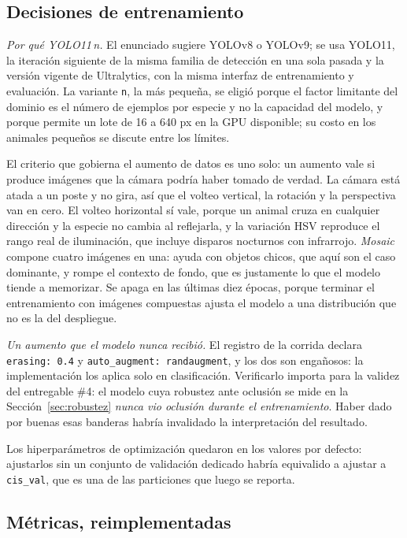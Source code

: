 \subsection{Decisiones de entrenamiento}
\label{sec:metodo_aumento}



\emph{Por qué YOLO11\,n.} El enunciado sugiere YOLOv8 o YOLOv9; se usa YOLO11,
la iteración siguiente de la misma familia de detección en una sola pasada y la
versión vigente de Ultralytics, con la misma interfaz de entrenamiento y
evaluación. La variante \texttt{n}, la más pequeña, se eligió porque el factor
limitante del dominio es el número de ejemplos por especie y no la capacidad del
modelo, y porque permite un lote de 16 a 640 px en la GPU disponible; su costo en
los animales pequeños se discute entre los límites.

El criterio que gobierna el aumento de datos es uno solo: un aumento vale si
produce imágenes que la cámara podría haber tomado de verdad. La cámara está
atada a un poste y no gira, así que el volteo vertical, la rotación y la
perspectiva van en cero. El volteo horizontal sí vale, porque un animal cruza en
cualquier dirección y la especie no cambia al reflejarla, y la variación HSV
reproduce el rango real de iluminación, que incluye disparos nocturnos con
infrarrojo. \emph{Mosaic} compone cuatro imágenes en una: ayuda con objetos
chicos, que aquí son el caso dominante, y rompe el contexto de fondo, que es
justamente lo que el modelo tiende a memorizar. Se apaga en las últimas diez
épocas, porque terminar el entrenamiento con imágenes compuestas ajusta el modelo
a una distribución que no es la del despliegue.

\emph{Un aumento que el modelo nunca recibió.} El registro de la corrida
declara \texttt{erasing: 0.4} y \texttt{auto\_augment: randaugment}, y los dos
son engañosos: la implementación los aplica solo en clasificación. Verificarlo
importa para la validez del entregable \#4: el modelo cuya robustez ante oclusión
se mide en la Sección~\ref{sec:robustez} \emph{nunca vio oclusión durante el
entrenamiento}. Haber dado por buenas esas banderas habría invalidado la
interpretación del resultado.

Los hiperparámetros de optimización quedaron en los valores por defecto:
ajustarlos sin un conjunto de validación dedicado habría equivalido a ajustar a
\texttt{cis\_val}, que es una de las particiones que luego se reporta.

\subsection{Métricas, reimplementadas}
\label{sec:metricas}


